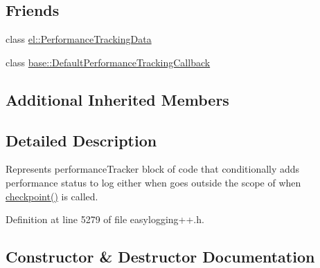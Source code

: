 \subsection*{Friends}
\begin{DoxyCompactItemize}
\item 
class \hyperlink{classel_1_1base_1_1_performance_tracker_a7a4da7334b79856c37538484584207a6}{el\+::\+Performance\+Tracking\+Data}
\item 
class \hyperlink{classel_1_1base_1_1_performance_tracker_ad346c4097e3db22a7434e7da5aa9c5e3}{base\+::\+Default\+Performance\+Tracking\+Callback}
\end{DoxyCompactItemize}
\subsection*{Additional Inherited Members}


\subsection{Detailed Description}
Represents performance\+Tracker block of code that conditionally adds performance status to log either when goes outside the scope of when \hyperlink{classel_1_1base_1_1_performance_tracker_aec9a6e149674c5782cc855e49aeb0aaf}{checkpoint()} is called. 

Definition at line 5279 of file easylogging++.\+h.



\subsection{Constructor \& Destructor Documentation}
\hypertarget{classel_1_1base_1_1_performance_tracker_a46ac6a851c6d1cde6742a7ebfeedd1b6}{}
